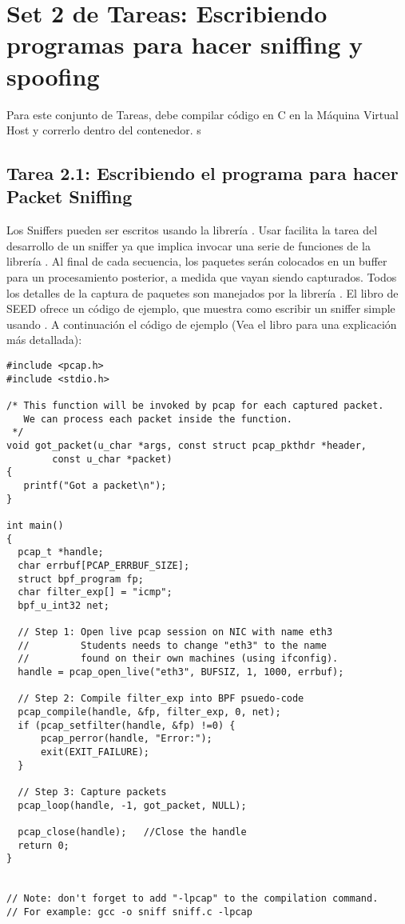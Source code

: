 \section{Set 2 de Tareas: Escribiendo programas para hacer sniffing y spoofing}

Para este conjunto de Tareas, debe compilar código en C en la Máquina Virtual Host y correrlo dentro del contenedor.
s
\subsection{Tarea 2.1: Escribiendo el programa para hacer Packet Sniffing}

Los Sniffers pueden ser escritos usando la librería \pcap. Usar \pcap facilita la tarea del desarrollo de un sniffer ya que implica invocar una serie de funciones de la librería \pcap. Al final de cada secuencia, los paquetes serán colocados en un buffer para un procesamiento posterior, a medida que vayan siendo capturados.
Todos los detalles de la captura de paquetes son manejados por la librería \pcap.
El libro de SEED ofrece un código de ejemplo, que muestra como escribir un sniffer simple usando \pcap. 
A continuación el código de ejemplo (Vea el libro para una explicación más detallada):


\begin{lstlisting}
#include <pcap.h>
#include <stdio.h>

/* This function will be invoked by pcap for each captured packet.
   We can process each packet inside the function.  
 */
void got_packet(u_char *args, const struct pcap_pkthdr *header,
        const u_char *packet)
{
   printf("Got a packet\n");
}

int main()
{
  pcap_t *handle;
  char errbuf[PCAP_ERRBUF_SIZE];
  struct bpf_program fp;
  char filter_exp[] = "icmp";
  bpf_u_int32 net;

  // Step 1: Open live pcap session on NIC with name eth3
  //         Students needs to change "eth3" to the name 
  //         found on their own machines (using ifconfig).
  handle = pcap_open_live("eth3", BUFSIZ, 1, 1000, errbuf); 

  // Step 2: Compile filter_exp into BPF psuedo-code
  pcap_compile(handle, &fp, filter_exp, 0, net);            
  if (pcap_setfilter(handle, &fp) !=0) {                   
      pcap_perror(handle, "Error:");
      exit(EXIT_FAILURE);
  }

  // Step 3: Capture packets
  pcap_loop(handle, -1, got_packet, NULL);                  

  pcap_close(handle);   //Close the handle
  return 0;
}


// Note: don't forget to add "-lpcap" to the compilation command.
// For example: gcc -o sniff sniff.c -lpcap
\end{lstlisting}

